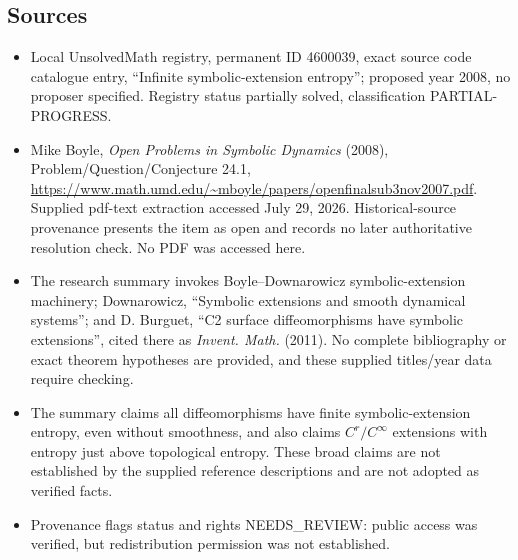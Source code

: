 \documentclass[11pt]{article}
\begin{document}
\subsection{Sources}
\begin{itemize}
\item Local UnsolvedMath registry, permanent ID 4600039, exact source code catalogue entry, ``Infinite symbolic-extension entropy''; proposed year 2008, no proposer specified. Registry status partially solved, classification PARTIAL-PROGRESS.
\item Mike Boyle, \emph{Open Problems in Symbolic Dynamics} (2008), Problem/Question/Conjecture 24.1, \url{https://www.math.umd.edu/~mboyle/papers/openfinalsub3nov2007.pdf}. Supplied pdf-text extraction accessed July 29, 2026. Historical-source provenance presents the item as open and records no later authoritative resolution check. No PDF was accessed here.
\item The research summary invokes Boyle--Downarowicz symbolic-extension machinery; Downarowicz, ``Symbolic extensions and smooth dynamical systems''; and D. Burguet, ``C2 surface diffeomorphisms have symbolic extensions'', cited there as \emph{Invent. Math.} (2011). No complete bibliography or exact theorem hypotheses are provided, and these supplied titles/year data require checking.
\item The summary claims all diffeomorphisms have finite symbolic-extension entropy, even without smoothness, and also claims $C^r/C^\infty$ extensions with entropy just above topological entropy. These broad claims are not established by the supplied reference descriptions and are not adopted as verified facts.
\item Provenance flags status and rights NEEDS\_REVIEW: public access was verified, but redistribution permission was not established.
\end{itemize}
\end{document}

